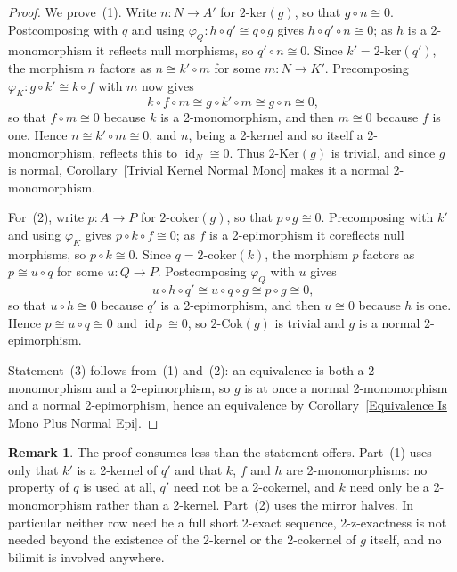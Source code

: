 \documentclass[reqno,a4paper]{amsart}
\numberwithin{equation}{section}
\theoremstyle{plain}
\theoremstyle{definition}
\newtheorem{remark}[subsection]{Remark}
\def\nameit#1{\textrm{#1}~}
\def\corx{\nameit{Corollary}}
\newcommand{\comp}{\circ}
\newcommand{\iso}{\cong}
\def\phi{\varphi}
\renewcommand{\1}{\onecat{1}}
\newcommand{\TwoKer}{\ensuremath{2\text{-}\mathrm{Ker}}}
\newcommand{\TwoCoker}{\ensuremath{2\text{-}\mathrm{Cok}}}
\newcommand{\twoker}{\ensuremath{2\text{-}\mathrm{ker}}}
\newcommand{\twocoker}{\ensuremath{2\text{-}\mathrm{coker}}}
\newcommand{\id}[1]{\operatorname{id}_{#1}}
\begin{document}
\begin{proof}
	We prove~(1). Write \(n\colon N\to A'\) for \(\twoker(g)\), so that \(g\comp n\iso 0\). Postcomposing with \(q\) and using \(\phi_Q\colon h\comp q'\iso q\comp g\) gives \(h\comp q'\comp n\iso 0\); as \(h\) is a 2-monomorphism it reflects null morphisms, so \(q'\comp n\iso 0\). Since \(k'=\twoker(q')\), the morphism \(n\) factors as \(n\iso k'\comp m\) for some \(m\colon N\to K'\). Precomposing \(\phi_K\colon g\comp k'\iso k\comp f\) with \(m\) now gives
	\[
		k\comp f\comp m\iso g\comp k'\comp m\iso g\comp n\iso 0\text{,}
	\]
	so that \(f\comp m\iso 0\) because \(k\) is a 2-monomorphism, and then \(m\iso 0\) because \(f\) is one. Hence \(n\iso k'\comp m\iso 0\), and \(n\), being a 2-kernel and so itself a 2-monomorphism, reflects this to \(\id{N}\iso 0\). Thus \(\TwoKer(g)\) is trivial, and since \(g\) is normal, \corx\ref{Trivial Kernel Normal Mono} makes it a normal 2-monomorphism.

	For~(2), write \(p\colon A\to P\) for \(\twocoker(g)\), so that \(p\comp g\iso 0\). Precomposing with \(k'\) and using \(\phi_K\) gives \(p\comp k\comp f\iso 0\); as \(f\) is a 2-epimorphism it coreflects null morphisms, so \(p\comp k\iso 0\). Since \(q=\twocoker(k)\), the morphism \(p\) factors as \(p\iso u\comp q\) for some \(u\colon Q\to P\). Postcomposing \(\phi_Q\) with \(u\) gives
	\[
		u\comp h\comp q'\iso u\comp q\comp g\iso p\comp g\iso 0\text{,}
	\]
	so that \(u\comp h\iso 0\) because \(q'\) is a 2-epimorphism, and then \(u\iso 0\) because \(h\) is one. Hence \(p\iso u\comp q\iso 0\) and \(\id{P}\iso 0\), so \(\TwoCoker(g)\) is trivial and \(g\) is a normal 2-epimorphism.

	Statement~(3) follows from~(1) and~(2): an equivalence is both a 2-monomorphism and a 2-epimorphism, so \(g\) is at once a normal 2-monomorphism and a normal 2-epimorphism, hence an equivalence by \corx\ref{Equivalence Is Mono Plus Normal Epi}.
\end{proof}

\begin{remark}\label{Rem NSFL Hypotheses}
	The proof consumes less than the statement offers. Part~(1) uses only that \(k'\) is a 2-kernel of \(q'\) and that \(k\), \(f\) and \(h\) are 2-monomorphisms: no property of \(q\) is used at all, \(q'\) need not be a 2-cokernel, and \(k\) need only be a 2-monomorphism rather than a 2-kernel. Part~(2) uses the mirror halves. In particular neither row need be a full short 2-exact sequence, 2-z-exactness is not needed beyond the existence of the 2-kernel or the 2-cokernel of \(g\) itself, and no bilimit is involved anywhere.
\end{remark}
\end{document}
